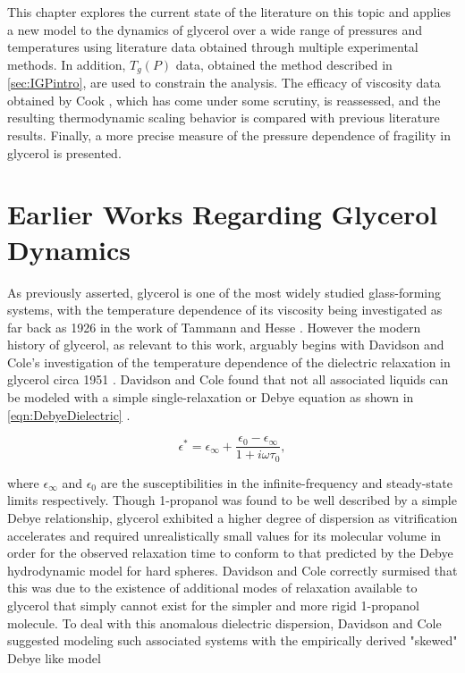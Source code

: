 This chapter explores the current state of the literature on this topic and applies a new model to the dynamics of glycerol over a wide range of pressures and temperatures using literature data obtained through multiple experimental methods. In addition, $T_g(P)$ data, obtained \via the \tgp method described in \sect \ref{sec:IGPintro}, are used to constrain the analysis. The efficacy of viscosity data obtained by Cook \etal, which has come under some scrutiny, is reassessed, and the resulting thermodynamic scaling behavior is compared with previous literature results. Finally, a more precise measure of the pressure dependence of fragility in glycerol is presented.

\section{Earlier Works Regarding Glycerol Dynamics}

As previously asserted, glycerol is one of the most widely studied glass-forming systems, with the temperature dependence of its viscosity being investigated as far back as 1926 in the work of Tammann and Hesse \nolinebreak\cite{Tammann}.  However the modern history of glycerol, as relevant to this work, arguably begins with Davidson and Cole's investigation of the temperature dependence of the dielectric relaxation in glycerol circa 1951 \nolinebreak\cite{Davidson}.  Davidson and Cole found that not all associated liquids can be modeled with a simple single-relaxation or Debye equation as shown in \eqn\nolinebreak \ref{eqn:DebyeDielectric} \nolinebreak\cite{Debye}.  

\begin{equation}
\epsilon^*=\epsilon_\infty+\frac{\epsilon_0-\epsilon_\infty}{ 1+i\omega\tau_{0} },
\label{eqn:DebyeDielectric}
\end{equation}

 \noindent where $\epsilon_\infty$ and $\epsilon_0$ are the susceptibilities in the infinite-frequency and steady-state limits respectively.  Though 1-propanol was found to be well described by a simple Debye relationship, glycerol exhibited a higher degree of dispersion as vitrification accelerates and required unrealistically small values for its molecular volume in order for the observed relaxation time to conform to that predicted by the Debye hydrodynamic model for hard spheres.  Davidson and Cole correctly surmised that this was due to the existence of additional modes of relaxation available to glycerol that simply cannot exist for the simpler and more rigid 1-propanol molecule. To deal with this anomalous dielectric dispersion, Davidson and Cole suggested modeling such associated systems with the empirically derived "skewed" Debye like model 

